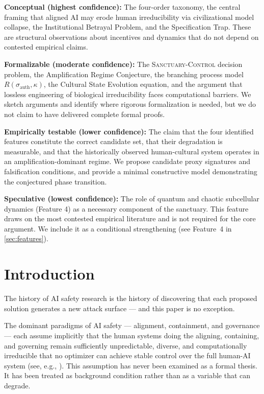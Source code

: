 \documentclass[11pt, a4paper]{article}
\theoremstyle{remark}
\newcommand{\SC}{\textsc{Sanctuary-Control}}
\begin{document}
\textbf{Conceptual (highest confidence):} The four-order taxonomy, the central framing that aligned AI may erode human irreducibility via civilizational model collapse, the Institutional Betrayal Problem, and the Specification Trap. These are structural observations about incentives and dynamics that do not depend on contested empirical claims.

\textbf{Formalizable (moderate confidence):} The \SC{} decision problem, the Amplification Regime Conjecture, the branching process model $R(\sigma_{\text{auth}}, \kappa)$, the Cultural State Evolution equation, and the argument that lossless engineering of biological irreducibility faces computational barriers. We sketch arguments and identify where rigorous formalization is needed, but we do not claim to have delivered complete formal proofs.

\textbf{Empirically testable (lower confidence):} The claim that the four identified features constitute the correct candidate set, that their degradation is measurable, and that the historically observed human-cultural system operates in an amplification-dominant regime. We propose candidate proxy signatures and falsification conditions, and provide a minimal constructive model demonstrating the conjectured phase transition.

\textbf{Speculative (lowest confidence):} The role of quantum and chaotic subcellular dynamics (Feature 4) as a necessary component of the sanctuary. This feature draws on the most contested empirical literature and is not required for the core argument. We include it as a conditional strengthening (see Feature~4 in \cref{sec:features}).

\section{Introduction}\label{sec:intro}

The history of AI safety research is the history of discovering that each proposed solution generates a new attack surface --- and this paper is no exception.

The dominant paradigms of AI safety --- alignment, containment, and governance --- each assume implicitly that the human systems doing the aligning, containing, and governing remain sufficiently unpredictable, diverse, and computationally irreducible that no optimizer can achieve stable control over the full human-AI system (see, e.g., \cite{bostrom2014, russell2019, omohundro2008}). This assumption has never been examined as a formal thesis. It has been treated as background condition rather than as a variable that can degrade.
\end{document}
